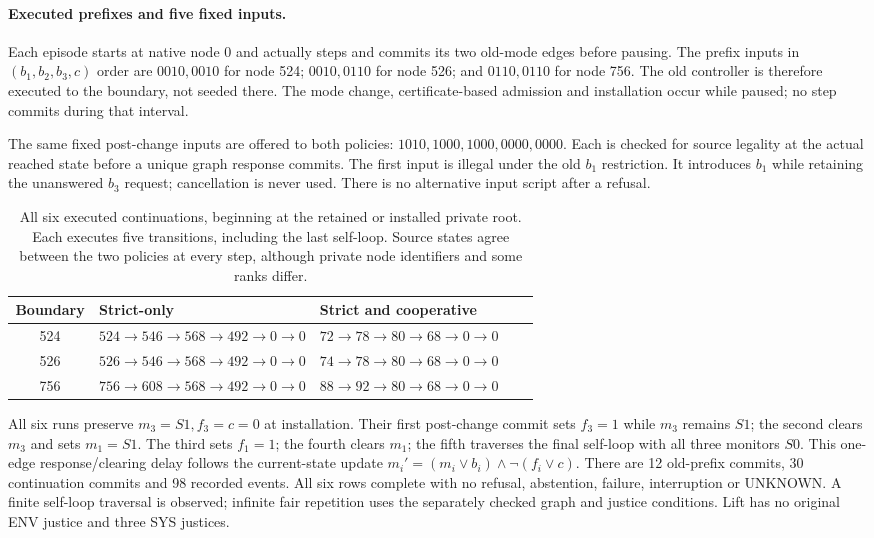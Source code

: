 \paragraph{Executed prefixes and five fixed inputs.}
Each episode starts at native node 0 and actually steps and commits its
two old-mode edges before pausing. The prefix inputs in
$(b_1,b_2,b_3,c)$ order are $0010,0010$ for node 524;
$0010,0110$ for node 526; and $0110,0110$ for node 756.
The old controller is therefore executed to the boundary, not seeded
there. The mode change, certificate-based admission and installation
occur while paused; no step commits during that interval.

The same fixed post-change inputs are offered to both policies:
$1010,1000,1000,0000,0000$. Each is checked for source legality at the
actual reached state before a unique graph response commits. The first
input is illegal under the old $b_1$ restriction. It introduces $b_1$
while retaining the unanswered $b_3$ request; cancellation is never used.
There is no alternative input script after a refusal.

\begin{table}[htbp]
\centering\small
\caption{All six executed continuations, beginning at the retained or
installed private root. Each executes five transitions, including the
last self-loop. Source states agree between the two policies at every
step, although private node identifiers and some ranks differ.}
\label{tab:pending-native-executions}
\begin{tabular}{@{}cL{0.425\linewidth}L{0.425\linewidth}@{}}
\toprule
Boundary & Strict-only & Strict and cooperative\\
 & $524\to546\to568\to492\to0\to0$ & $72\to78\to80\to68\to0\to0$\\
526 & $526\to546\to568\to492\to0\to0$ & $74\to78\to80\to68\to0\to0$\\
756 & $756\to608\to568\to492\to0\to0$ & $88\to92\to80\to68\to0\to0$\\
\bottomrule
\end{tabular}
\end{table}

All six runs preserve $m_3=S1,f_3=c=0$ at installation. Their first
post-change commit sets $f_3=1$ while $m_3$ remains $S1$; the second clears
$m_3$ and sets $m_1=S1$. The third sets $f_1=1$; the fourth clears $m_1$;
the fifth traverses the final self-loop with all three monitors $S0$.
This one-edge response/clearing delay follows the current-state update
$m_i'=(m_i\lor b_i)\land\neg(f_i\lor c)$.
There are 12 old-prefix commits, 30 continuation commits and 98 recorded
events. All six rows complete with no refusal, abstention, failure,
interruption or UNKNOWN. A finite self-loop traversal is observed;
infinite fair repetition uses the separately checked graph and justice
conditions. Lift has no original ENV justice and three SYS justices.

